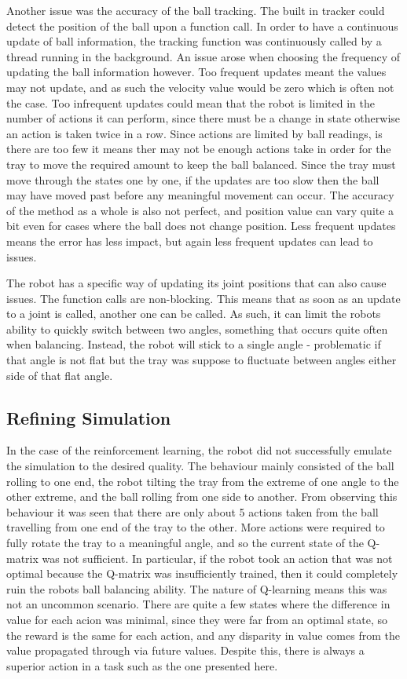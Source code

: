 \documentclass[12pt,a4paper]{article}
\begin{document}
Another issue was the accuracy of the ball tracking. The built in tracker could detect the position of the ball upon a function call. In order to have a continuous update of ball information, the tracking function was continuously called by a thread running in the background. An issue arose when choosing the frequency of updating the ball information however. Too frequent updates meant the values may not update, and as such the velocity value would be zero which is often not the case. Too infrequent updates could mean that the robot is limited in the number of actions it can perform, since there must be a change in state otherwise an action is taken twice in a row. Since actions are limited by ball readings, is there are too few it means ther may not be enough actions take in order for the tray to move the required amount to keep the ball balanced. Since the tray must move through the states one by one, if the updates are too slow then the ball may have moved past before any meaningful movement can occur. The accuracy of the method as a whole is also not perfect, and position value can vary quite a bit even for cases where the ball does not change position. Less frequent updates means the error has less impact, but again less frequent updates can lead to issues.

The robot has a specific way of updating its joint positions that can also cause issues. The function calls are non-blocking. This means that as soon as an update to a joint is called, another one can be called. As such, it can limit the robots ability to quickly switch between two angles, something that occurs quite often when balancing. Instead, the robot will stick to a single angle - problematic if that angle is not flat but the tray was suppose to fluctuate between angles either side of that flat angle. 

\subsection{Refining Simulation}
In the case of the reinforcement learning, the robot did not successfully emulate the simulation to the desired quality. The behaviour mainly consisted of the ball rolling to one end, the robot tilting the tray from the extreme of one angle to the other extreme, and the ball rolling from one side to another. From observing this behaviour it was seen that there are only about 5 actions taken from the ball travelling from one end of the tray to the other. More actions were required to fully rotate the tray to a meaningful angle, and so the current state of the Q-matrix was not sufficient. In particular, if the robot took an action that was not optimal because the Q-matrix was insufficiently trained, then it could completely ruin the robots ball balancing ability. The nature of Q-learning means this was not an uncommon scenario. There are quite a few states where the difference in value for each acion was minimal, since they were far from an optimal state, so the reward is the same for each action, and any disparity in value comes from the value propagated through via future values. Despite this, there is always a superior action in a task such as the one presented here.
\end{document}
